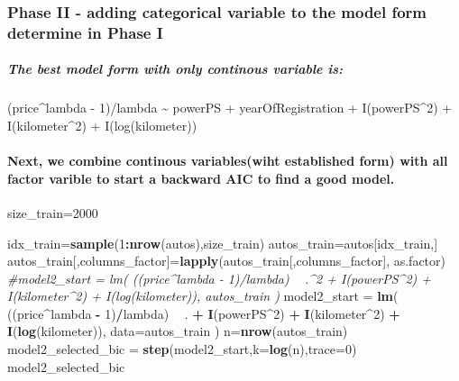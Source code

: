 \documentclass[]{article}
\newenvironment{Shaded}{\begin{snugshade}}{\end{snugshade}}
\newcommand{\CommentTok}[1]{\textcolor[rgb]{0.56,0.35,0.01}{\textit{#1}}}
\newcommand{\DataTypeTok}[1]{\textcolor[rgb]{0.13,0.29,0.53}{#1}}
\newcommand{\DecValTok}[1]{\textcolor[rgb]{0.00,0.00,0.81}{#1}}
\newcommand{\KeywordTok}[1]{\textcolor[rgb]{0.13,0.29,0.53}{\textbf{#1}}}
\newcommand{\NormalTok}[1]{#1}
\newcommand{\OperatorTok}[1]{\textcolor[rgb]{0.81,0.36,0.00}{\textbf{#1}}}
\newcommand{\StringTok}[1]{\textcolor[rgb]{0.31,0.60,0.02}{#1}}
\let\oldparagraph\paragraph
\renewcommand{\paragraph}[1]{\oldparagraph{#1}\mbox{}}
\let\oldsubparagraph\subparagraph
\renewcommand{\subparagraph}[1]{\oldsubparagraph{#1}\mbox{}}
\begin{document}
\hypertarget{phase-ii---adding-categorical-variable-to-the-model-form-determine-in-phase-i}{%
\subsubsection{Phase II - adding categorical variable to the model form
determine in Phase
I}\label{phase-ii---adding-categorical-variable-to-the-model-form-determine-in-phase-i}}

\hypertarget{the-best-model-form-with-only-continous-variable-is}{%
\subparagraph{The best model form with only continous variable
is:}\label{the-best-model-form-with-only-continous-variable-is}}

(price\^{}lambda - 1)/lambda \textasciitilde{} powerPS +
yearOfRegistration + I(powerPS\^{}2) + I(kilometer\^{}2) +
I(log(kilometer))

\hypertarget{next-we-combine-continous-variableswiht-established-form-with-all-factor-varible-to-start-a-backward-aic-to-find-a-good-model.}{%
\paragraph{Next, we combine continous variables(wiht established form)
with all factor varible to start a backward AIC to find a good
model.}\label{next-we-combine-continous-variableswiht-established-form-with-all-factor-varible-to-start-a-backward-aic-to-find-a-good-model.}}

\begin{Shaded}
\begin{Highlighting}[]
\NormalTok{size_train=}\DecValTok{2000}

\NormalTok{idx_train=}\KeywordTok{sample}\NormalTok{(}\DecValTok{1}\OperatorTok{:}\KeywordTok{nrow}\NormalTok{(autos),size_train)}
\NormalTok{autos_train=autos[idx_train,]}
\NormalTok{autos_train[,columns_factor]=}\KeywordTok{lapply}\NormalTok{(autos_train[,columns_factor], as.factor)}
\CommentTok{#model2_start = lm( ((price^lambda - 1)/lambda) ~ .^2 +  I(powerPS^2) + I(kilometer^2) + I(log(kilometer)), autos_train ) }
\NormalTok{model2_start =}\StringTok{ }\KeywordTok{lm}\NormalTok{( ((price}\OperatorTok{^}\NormalTok{lambda }\OperatorTok{-}\StringTok{ }\DecValTok{1}\NormalTok{)}\OperatorTok{/}\NormalTok{lambda) }\OperatorTok{~}\StringTok{ }\NormalTok{. }\OperatorTok{+}\StringTok{  }\KeywordTok{I}\NormalTok{(powerPS}\OperatorTok{^}\DecValTok{2}\NormalTok{) }\OperatorTok{+}\StringTok{ }\KeywordTok{I}\NormalTok{(kilometer}\OperatorTok{^}\DecValTok{2}\NormalTok{) }\OperatorTok{+}\StringTok{ }\KeywordTok{I}\NormalTok{(}\KeywordTok{log}\NormalTok{(kilometer)), }\DataTypeTok{data=}\NormalTok{autos_train ) }
\NormalTok{n=}\KeywordTok{nrow}\NormalTok{(autos_train)}
\NormalTok{model2_selected_bic =}\StringTok{ }\KeywordTok{step}\NormalTok{(model2_start,}\DataTypeTok{k=}\KeywordTok{log}\NormalTok{(n),}\DataTypeTok{trace=}\DecValTok{0}\NormalTok{)}
\NormalTok{model2_selected_bic}
\end{Highlighting}
\end{Shaded}
\end{document}
